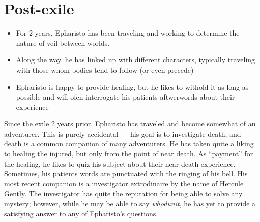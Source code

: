 \documentclass[10pt,twoside,twocolumn,openany]{book}
\begin{document}
\section{Post-exile}
\begin{itemize}
  \item For 2 years, Epharisto has been traveling and working to determine the nature of veil between worlds.
  \item Along the way, he has linked up with different characters, typically traveling with those whom bodies tend to follow (or even precede)
  \item Epharisto is happy to provide healing, but he likes to withold it as long as possible and will ofen interrogate his patients aftwerwords about their experience
\end{itemize}
Since the exile 2 years prior, Epharisto has traveled and become somewhat of an adventurer.
This is purely accidental --- his goal is to investigate death, and death is a common companion of many adventurers.
He has taken quite a liking to healing the injured, but only from the point of near death.
As ``payment'' for the healing, he likes to quiz his subject about their near-death experience.
Sometimes, his patients words are punctuated with the ringing of his bell.
His most recent companion is a investigator extrodinaire by the name of Hercule Gently.
The investigator has quite the reputation for being able to solve any mystery; however, while he may be able to say \emph{whodunit}, he has yet to provide a satisfying answer to any of Epharisto's questions.\\
\end{document}
